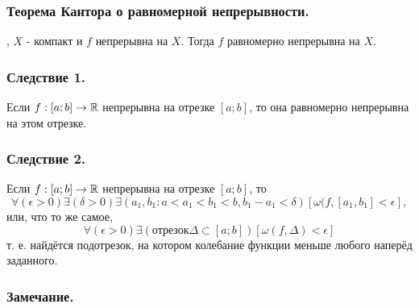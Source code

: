 \subsubsection{Теорема Кантора о равномерной непрерывности.}
\fXR, $X$ - компакт и $f$ непрерывна на $X$.
Тогда $f$ равномерно непрерывна на $X$.

\subsubsection{Следствие 1.}

Если $f:[a;b] \to \mathbb{R}$ непрерывна на отрезке $[a;b]$, то она равномерно непрерывна на этом отрезке.

\subsubsection{Следствие 2.}

Если $f:[a;b] \to \mathbb{R}$ непрерывна на отрезке $[a;b]$, то
$$
\forall(\epsilon > 0) \exists (\delta > 0) \exists(a_1, b_1 : a < a_1 < b_1 < b, b_1 - a_1<\delta)[\omega(f,[a_1,b_1]<\epsilon],
$$
или, что то же самое,
$$
\forall(\epsilon > 0) \exists (отрезок \Delta \subset [a;b])[\omega(f,\Delta)<\epsilon]
$$
т. е. найдётся подотрезок, на котором колебание функции меньше любого наперёд заданного.

\subsubsection{Замечание.}


